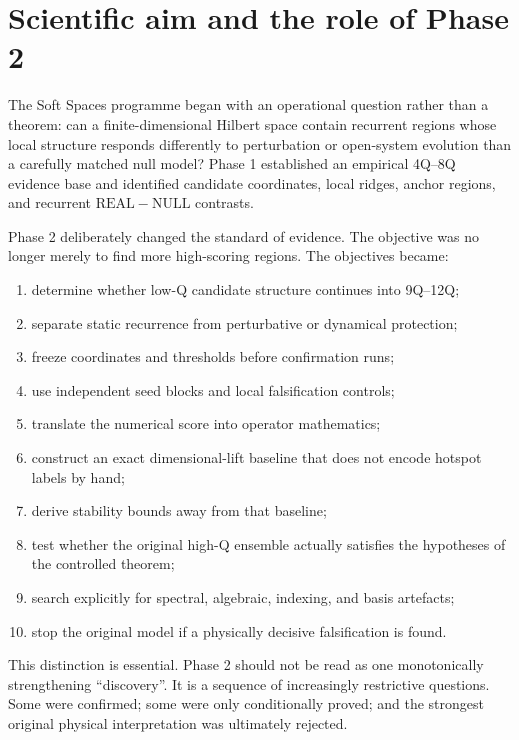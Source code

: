 \documentclass[11pt,a4paper]{article}
\newcommand{\Real}{\mathrm{REAL}}
\newcommand{\Null}{\mathrm{NULL}}
\begin{document}
\section{Scientific aim and the role of Phase 2}

The Soft Spaces programme began with an operational question rather than a
theorem: can a finite-dimensional Hilbert space contain recurrent regions
whose local structure responds differently to perturbation or open-system
evolution than a carefully matched null model?  Phase 1 established an
empirical 4Q--8Q evidence base and identified candidate coordinates, local
ridges, anchor regions, and recurrent \(\Real-\Null\) contrasts.

Phase 2 deliberately changed the standard of evidence.  The objective was no
longer merely to find more high-scoring regions.  The objectives became:

\begin{enumerate}[label=\arabic*.]
\item determine whether low-Q candidate structure continues into 9Q--12Q;
\item separate static recurrence from perturbative or dynamical protection;
\item freeze coordinates and thresholds before confirmation runs;
\item use independent seed blocks and local falsification controls;
\item translate the numerical score into operator mathematics;
\item construct an exact dimensional-lift baseline that does not encode
      hotspot labels by hand;
\item derive stability bounds away from that baseline;
\item test whether the original high-Q ensemble actually satisfies the
      hypotheses of the controlled theorem;
\item search explicitly for spectral, algebraic, indexing, and basis
      artefacts;
\item stop the original model if a physically decisive falsification is found.
\end{enumerate}

This distinction is essential.  Phase 2 should not be read as one monotonically
strengthening ``discovery''.  It is a sequence of increasingly restrictive
questions.  Some were confirmed; some were only conditionally proved; and the
strongest original physical interpretation was ultimately rejected.
\end{document}
